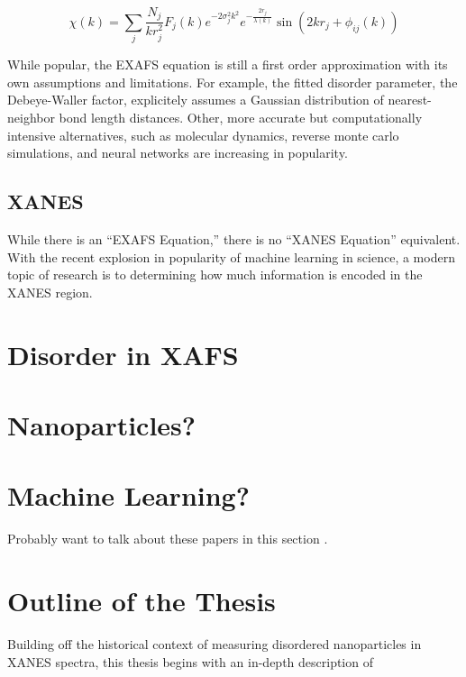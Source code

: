 \begin{equation}
    \label{ExafsFormula}
    \chi(k) = \sum_j \frac{N_j}{kr_j^2}F_j(k)e^{-2\sigma_j^2k^2}e^{-\tfrac{2r_j}{\lambda(k)}}\sin(2kr_j + \phi_{ij}(k))
\end{equation}



While popular, the EXAFS equation is still a first order approximation with its own assumptions and limitations. For example, the fitted disorder parameter, the Debeye-Waller factor, explicitely assumes a Gaussian distribution of nearest-neighbor bond length distances. Other, more accurate but computationally intensive alternatives, such as molecular dynamics, reverse monte carlo simulations, and neural networks are increasing in popularity.

\subsection{XANES}
While there is an ``EXAFS Equation,'' there is no ``XANES Equation'' equivalent. With the recent explosion in popularity of machine learning in science, a modern topic of research is to determining how much information is encoded in the XANES region.

\section{Disorder in XAFS}

\section{Nanoparticles?}
\section{Machine Learning?}

Probably want to talk about these papers in this section \cite{timoshenko2018neural} \cite{Timoshenko2017}.
\section{Outline of the Thesis}
Building off the historical context of measuring disordered nanoparticles in XANES spectra, this thesis begins with an in-depth description of 

